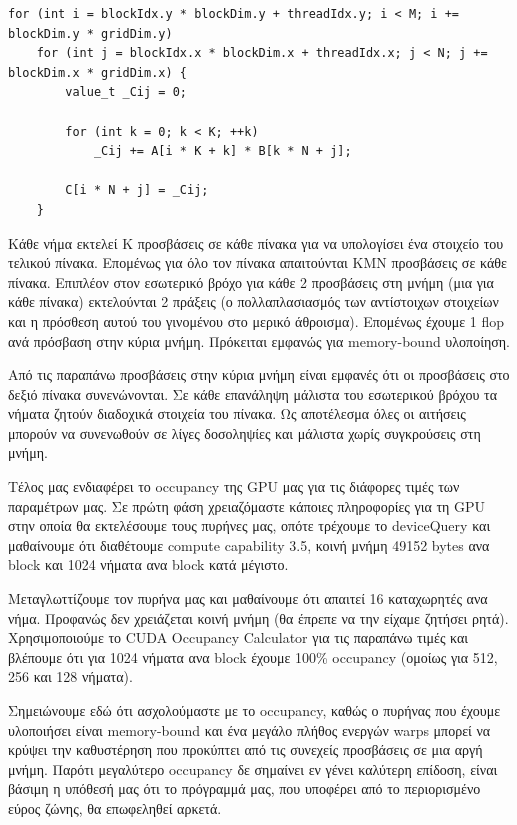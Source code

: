\documentclass[titlepage]{article}
\begin{document}
\begin{verbatim}
for (int i = blockIdx.y * blockDim.y + threadIdx.y; i < M; i += blockDim.y * gridDim.y)
    for (int j = blockIdx.x * blockDim.x + threadIdx.x; j < N; j += blockDim.x * gridDim.x) {
        value_t _Cij = 0;

        for (int k = 0; k < K; ++k)
            _Cij += A[i * K + k] * B[k * N + j];

        C[i * N + j] = _Cij;
    }
\end{verbatim}

Κάθε νήμα εκτελεί K προσβάσεις σε κάθε πίνακα για να υπολογίσει ένα στοιχείο του τελικού πίνακα. Επομένως για όλο τον πίνακα απαιτούνται ΚΜΝ προσβάσεις σε κάθε πίνακα. Επιπλέον στον εσωτερικό βρόχο για κάθε 2 προσβάσεις στη μνήμη (μια για κάθε πίνακα) εκτελούνται 2 πράξεις (ο πολλαπλασιασμός των αντίστοιχων στοιχείων και η πρόσθεση αυτού του γινομένου στο μερικό άθροισμα). Επομένως έχουμε 1 flop ανά πρόσβαση στην κύρια μνήμη. Πρόκειται εμφανώς για memory-bound υλοποίηση.

Από τις παραπάνω προσβάσεις στην κύρια μνήμη είναι εμφανές ότι οι προσβάσεις στο δεξιό πίνακα συνενώνονται. Σε κάθε επανάληψη μάλιστα του εσωτερικού βρόχου τα νήματα ζητούν διαδοχικά στοιχεία του πίνακα. Ως αποτέλεσμα όλες οι αιτήσεις μπορούν να συνενωθούν σε λίγες δοσοληψίες και μάλιστα χωρίς συγκρούσεις στη μνήμη.

Τέλος μας ενδιαφέρει το occupancy της GPU μας για τις διάφορες τιμές των παραμέτρων μας. Σε πρώτη φάση χρειαζόμαστε κάποιες πληροφορίες για τη GPU στην οποία θα εκτελέσουμε τους πυρήνες μας, οπότε τρέχουμε το deviceQuery και μαθαίνουμε ότι διαθέτουμε compute capability 3.5, κοινή μνήμη 49152 bytes ανα block και 1024 νήματα ανα block κατά μέγιστο.

Μεταγλωττίζουμε τον πυρήνα μας και μαθαίνουμε ότι απαιτεί 16 καταχωρητές ανα νήμα. Προφανώς δεν χρειάζεται κοινή μνήμη (θα έπρεπε να την είχαμε ζητήσει ρητά). Χρησιμοποιούμε το CUDA Occupancy Calculator για τις παραπάνω τιμές και βλέπουμε ότι για 1024 νήματα ανα block έχουμε 100\% occupancy (ομοίως για 512, 256 και 128 νήματα).

Σημειώνουμε εδώ ότι ασχολούμαστε με το occupancy, καθώς ο πυρήνας που έχουμε υλοποιήσει είναι memory-bound και ένα μεγάλο πλήθος ενεργών warps μπορεί να κρύψει την καθυστέρηση που προκύπτει από τις συνεχείς προσβάσεις σε μια αργή μνήμη. Παρότι μεγαλύτερο occupancy δε σημαίνει εν γένει καλύτερη επίδοση, είναι βάσιμη η υπόθεσή μας ότι το πρόγραμμά μας, που υποφέρει από το περιορισμένο εύρος ζώνης, θα επωφεληθεί αρκετά.
\end{document}
